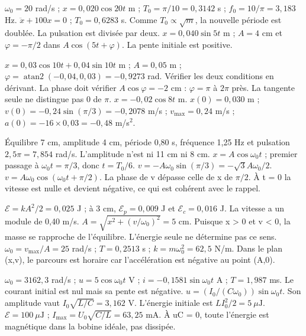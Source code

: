 $\omega_0=20$ rad/s ; $x=0{,}020\cos20t$ m ; $T_0=\pi/10=0{,}3142$ s ; $f_0=10/\pi=3{,}183$ Hz.
$\ddot x+100x=0$ ; $T_0=0{,}6283$ s. Comme $T_0\propto\sqrt m$, la nouvelle période est doublée. La pulsation est divisée par deux.
$x=0{,}040\sin5t$ m ; $A=4$ cm et $\varphi=-\pi/2$ dans $A\cos(5t+\varphi)$. La pente initiale est positive.


$x=0{,}03\cos10t+0{,}04\sin10t$ m ; $A=0{,}05$ m ; $\varphi=\operatorname{atan2}(-0{,}04,0{,}03)=-0{,}9273$ rad. Vérifier les deux conditions en dérivant.
La phase doit vérifier $A\cos\varphi=-2$ cm : $\varphi=\pi$ à $2\pi$ près. La tangente seule ne distingue pas 0 de $\pi$. $x=-0{,}02\cos8t$ m.
$x(0)=0{,}030$ m ; $v(0)=-0{,}24\sin(\pi/3)=-0{,}2078$ m/s ; $v_{\max}=0{,}24$ m/s ; $a(0)=-16\times0{,}03=-0{,}48$ m/s$^2$.


Équilibre 7 cm, amplitude 4 cm, période 0,80 s, fréquence 1,25 Hz et pulsation $2{,}5\pi=7{,}854$ rad/s. L’amplitude n’est ni 11 cm ni 8 cm.
$x=A\cos\omega_0t$ ; premier passage à $\omega_0t=\pi/3$, donc $t=T_0/6$. $v=-A\omega_0\sin(\pi/3)=-\sqrt3A\omega_0/2$.
$v=A\omega_0\cos(\omega_0t+\pi/2)$. La phase de v dépasse celle de x de $\pi/2$. À t = 0 la vitesse est nulle et devient négative, ce qui est cohérent avec le rappel.


$\mathcal E=kA^2/2=0{,}025$ J ; à 3 cm, $\mathcal E_p=0{,}009$ J et $\mathcal E_c=0{,}016$ J. La vitesse a un module de 0,40 m/s.
$A=\sqrt{x^2+(v/\omega_0)^2}=5$ cm. Puisque x > 0 et v < 0, la masse se rapproche de l’équilibre. L’énergie seule ne détermine pas ce sens.
$\omega_0=v_{\max}/A=25$ rad/s ; $T=0{,}2513$ s ; $k=m\omega_0^2=62{,}5$ N/m. Dans le plan (x,v), le parcours est horaire car l’accélération est négative au point (A,0).


$\omega_0=3162{,}3$ rad/s ; $u=5\cos\omega_0t$ V ; $i=-0{,}1581\sin\omega_0t$ A ; $T=1{,}987$ ms. Le courant initial est nul mais sa pente est négative.
$u=(I_0/(C\omega_0))\sin\omega_0t$. Son amplitude vaut $I_0\sqrt{L/C}=3{,}162$ V. L’énergie initiale est $LI_0^2/2=5\ \mu\mathrm{ J}$.
$\mathcal E=100\ \mu\mathrm{ J}$ ; $I_{\max}=U_0\sqrt{C/L}=63{,}25$ mA. À uC = 0, toute l’énergie est magnétique dans la bobine idéale, pas dissipée.


